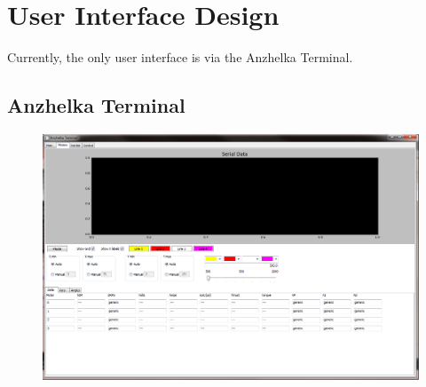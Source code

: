 \documentclass{article}
\numberwithin{equation}{section} %
\begin{document}





 
\section{User Interface Design}
Currently, the only user interface is via the Anzhelka Terminal.

\subsection{Anzhelka Terminal}
\begin{figure}[h!]
\centering
	\includegraphics[scale=.33]{anzhelka_terminal_data.png}
\end{figure}
\end{document}
